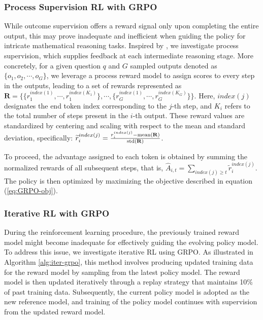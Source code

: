 \begin{itemize}[topsep=0pt]
\subsubsection{Process Supervision RL with GRPO}

While outcome supervision offers a reward signal only upon completing the entire output, this may prove inadequate and inefficient when guiding the policy for intricate mathematical reasoning tasks. Inspired by \cite{wang2023math}, we investigate process supervision, which supplies feedback at each intermediate reasoning stage. More concretely, for a given question $q$ and $G$ sampled outputs denoted as $\{o_1, o_2, \cdots, o_G\}$, we leverage a process reward model to assign scores to every step in the outputs, leading to a set of rewards represented as $\mathbf{R} = \{ \{r_1^{index(1)},\cdots,r_1^{index(K_1)}\}, \cdots,  \{r_G^{index(1)},\cdots,r_G^{index(K_G)}\} \}$. Here, $index(j)$ designates the end token index corresponding to the $j$-th step, and $K_i$ refers to the total number of steps present in the $i$-th output. These reward values are standardized by centering and scaling with respect to the mean and standard deviation, specifically: $\widetilde{r}_i^{index(j)} = \frac{r_i^{index(j)} - {\rm mean(\mathbf{R})}}{{\rm std(\mathbf{R})}}$.

To proceed, the advantage assigned to each token is obtained by summing the normalized rewards of all subsequent steps, that is, $\hat{A}_{i, t} = \sum_{index(j) \ge t} \widetilde{r}_i^{index(j)}$. The policy is then optimized by maximizing the objective described in equation (\ref{eq:GRPO-obj}).

\subsubsection{Iterative RL with GRPO} During the reinforcement learning procedure, the previously trained reward model might become inadequate for effectively guiding the evolving policy model. To address this issue, we investigate iterative RL using GRPO. As illustrated in Algorithm \ref{alg:iter-grpo}, this method involves producing updated training data for the reward model by sampling from the latest policy model. The reward model is then updated iteratively through a replay strategy that maintains 10\% of past training data. Subsequently, the current policy model is adopted as the new reference model, and training of the policy model continues with supervision from the updated reward model.


\end{itemize}
